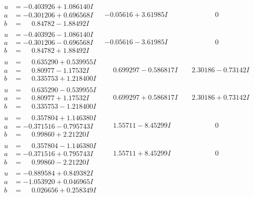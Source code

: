 \documentclass[1p]{elsarticle_modified}
\theoremstyle{definition}
\begin{document}
$$\begin{array}{c|c|c}
\begin{aligned}
u &= -0.403926 + 1.086140 I \\
a &= -0.301206 + 0.696568 I \\
b &= \phantom{-}0.84782 - 1.88492 I\end{aligned}
 & -0.05616 + 3.61985 I & \phantom{-0.000000 } 0 \\ \hline\begin{aligned}
u &= -0.403926 - 1.086140 I \\
a &= -0.301206 - 0.696568 I \\
b &= \phantom{-}0.84782 + 1.88492 I\end{aligned}
 & -0.05616 - 3.61985 I & \phantom{-0.000000 } 0 \\ \hline\begin{aligned}
u &= \phantom{-}0.635290 + 0.539955 I \\
a &= \phantom{-}0.80977 - 1.17532 I \\
b &= \phantom{-}0.335753 + 1.218400 I\end{aligned}
 & \phantom{-}0.699297 - 0.586817 I & \phantom{-}2.30186 - 0.73142 I \\ \hline\begin{aligned}
u &= \phantom{-}0.635290 - 0.539955 I \\
a &= \phantom{-}0.80977 + 1.17532 I \\
b &= \phantom{-}0.335753 - 1.218400 I\end{aligned}
 & \phantom{-}0.699297 + 0.586817 I & \phantom{-}2.30186 + 0.73142 I \\ \hline\begin{aligned}
u &= \phantom{-}0.357804 + 1.146380 I \\
a &= -0.371516 - 0.795743 I \\
b &= \phantom{-}0.99860 + 2.21220 I\end{aligned}
 & \phantom{-}1.55711 - 8.45299 I & \phantom{-0.000000 } 0 \\ \hline\begin{aligned}
u &= \phantom{-}0.357804 - 1.146380 I \\
a &= -0.371516 + 0.795743 I \\
b &= \phantom{-}0.99860 - 2.21220 I\end{aligned}
 & \phantom{-}1.55711 + 8.45299 I & \phantom{-0.000000 } 0 \\ \hline\begin{aligned}
u &= -0.889584 + 0.849382 I \\
a &= -1.053920 + 0.046965 I \\
b &= \phantom{-}0.026656 + 0.258349 I\end{aligned}

\end{array}$$
\end{document}
